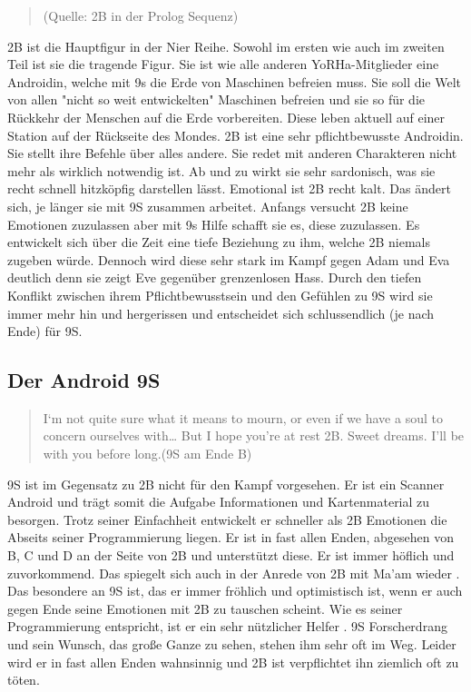 \begin{quote}
	(Quelle: 2B in der Prolog Sequenz)
\end{quote}
2B ist die Hauptfigur in der Nier Reihe. Sowohl im ersten wie auch im zweiten Teil ist sie die tragende Figur. Sie ist wie alle anderen YoRHa-Mitglieder eine Androidin, welche mit 9s die Erde von Maschinen befreien muss. Sie soll die Welt von allen "nicht so weit entwickelten" Maschinen befreien und sie so für die Rückkehr der Menschen auf die Erde vorbereiten. Diese leben aktuell auf einer Station auf der Rückseite des Mondes.  2B ist eine sehr pflichtbewusste Androidin. Sie stellt ihre Befehle über alles andere. Sie redet mit anderen Charakteren nicht mehr als wirklich notwendig ist. Ab und zu wirkt sie sehr sardonisch, was sie recht schnell hitzköpfig darstellen lässt. Emotional ist 2B recht kalt. Das ändert sich, je länger sie mit 9S zusammen arbeitet. Anfangs versucht 2B keine Emotionen zuzulassen aber mit 9s Hilfe schafft sie es, diese zuzulassen. Es entwickelt sich über die Zeit eine tiefe Beziehung zu ihm, welche 2B niemals zugeben würde. Dennoch wird diese sehr stark im Kampf gegen \dq Adam und Eva \dq  deutlich denn sie zeigt Eve gegenüber grenzenlosen Hass. Durch den tiefen Konflikt zwischen ihrem Pflichtbewusstsein und den Gefühlen zu 9S wird sie immer mehr hin und hergerissen und entscheidet sich schlussendlich (je nach Ende) für 9S. ~\cite{nier:automatawikia20192b}


\subsection{Der Android 9S}

\begin{quote}
	\dq I‘m not quite sure what it means to mourn, or even if we have a soul to concern ourselves with… But I hope you’re at rest 2B. Sweet dreams. I’ll be with you before long.\dq  \vspace{10px}(9S am Ende B)
\end{quote}
	9S ist im Gegensatz zu 2B nicht für den Kampf vorgesehen. Er ist ein Scanner Android und trägt somit die Aufgabe Informationen und Kartenmaterial zu besorgen. Trotz seiner \dq Einfachheit \dq entwickelt er schneller als 2B Emotionen die Abseits seiner Programmierung liegen. Er ist in fast allen Enden, abgesehen von B, C und D an der Seite von 2B und unterstützt diese. Er ist immer höflich und zuvorkommend. Das spiegelt sich auch in der Anrede von 2B mit \dq Ma'am \dq wieder . Das besondere an 9S ist, das er immer fröhlich und optimistisch ist, wenn er auch gegen Ende seine Emotionen mit 2B zu tauschen scheint. Wie es seiner Programmierung entspricht, ist er ein sehr nützlicher \dq Helfer \dq . 9S Forscherdrang und sein Wunsch, das große Ganze zu sehen, stehen ihm sehr oft im Weg. Leider wird er in fast allen Enden wahnsinnig und 2B ist verpflichtet ihn ziemlich oft zu töten. ~\cite{nier:automatawikia20199S}

